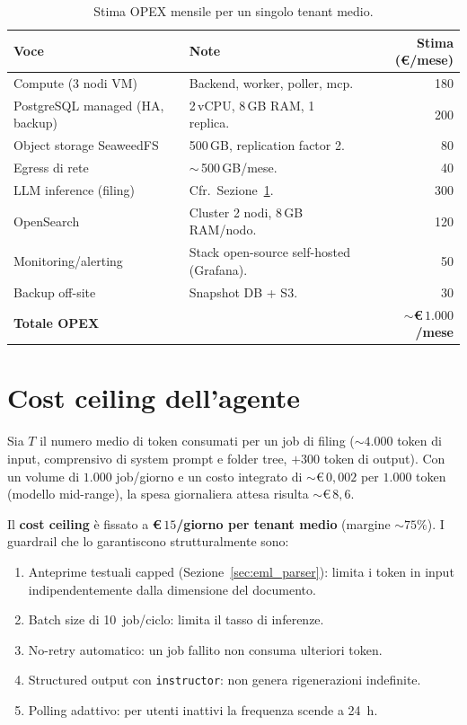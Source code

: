\begin{table}[ht]
\centering
\small
\begin{tabularx}{\linewidth}{l X r}
\toprule
\textbf{Voce} & \textbf{Note} & \textbf{Stima (\euro/mese)} \\
\midrule
Compute (3 nodi VM)              & Backend, worker, poller, mcp.          & 180 \\
PostgreSQL managed (HA, backup)  & 2\,vCPU, 8\,GB RAM, 1 replica.        & 200 \\
Object storage SeaweedFS         & 500\,GB, replication factor 2.         & 80 \\
Egress di rete                   & $\sim$\,500\,GB/mese.                  & 40 \\
LLM inference (filing)           & Cfr.\ Sezione~\ref{sec:agent_cost}.     & 300 \\
OpenSearch                       & Cluster 2 nodi, 8\,GB RAM/nodo.        & 120 \\
Monitoring/alerting              & Stack open-source self-hosted (Grafana).& 50 \\
Backup off-site                  & Snapshot DB + S3.                      & 30 \\
\midrule
\textbf{Totale OPEX}             &                                        & \textbf{$\sim$\euro$\,1.000$/mese} \\
\bottomrule
\end{tabularx}
\caption{Stima OPEX mensile per un singolo tenant medio.}
\label{tab:opex}
\end{table}

\section{Cost ceiling dell'agente}
\label{sec:agent_cost}

Sia $T$ il numero medio di token consumati per un job di filing ($\sim 4.000$ token
di input, comprensivo di system prompt e folder tree, $+ 300$ token di output).
Con un volume di $1.000$ job/giorno e un costo integrato di
$\sim$\euro$\,0{,}002$ per $1.000$ token (modello mid-range), la spesa giornaliera
attesa risulta $\sim$\euro$\,8{,}6$.

Il \textbf{cost ceiling} \`e fissato a \textbf{\euro$\,15$/giorno per tenant medio}
(margine $\sim 75\%$). I guardrail che lo garantiscono strutturalmente sono:
\begin{enumerate}[leftmargin=*]
    \item Anteprime testuali capped (Sezione~\ref{sec:eml_parser}): limita i token
          in input indipendentemente dalla dimensione del documento.
    \item Batch size di 10~job/ciclo: limita il tasso di inferenze.
    \item No-retry automatico: un job fallito non consuma ulteriori token.
    \item Structured output con \texttt{instructor}: non genera rigenerazioni
          indefinite.
    \item Polling adattivo: per utenti inattivi la frequenza scende a 24~h.
\end{enumerate}

